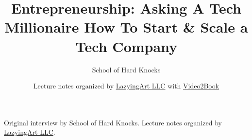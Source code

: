 \documentclass[11pt,oneside]{book}
\begin{document}
\frontmatter
\title{Entrepreneurship: Asking A Tech Millionaire How To Start \& Scale a Tech Company}
\author{School of Hard Knocks}
\date{Lecture notes organized by \href{https://lazying.art}{LazyingArt LLC} with \href{https://github.com/lachlanchen/Video2Book}{Video2Book}}
\maketitle
\begin{center}
\small Original interview by School of Hard Knocks. Lecture notes organized by \href{https://lazying.art}{LazyingArt LLC}.
\end{center}
\clearpage
\mainmatter

\end{document}
